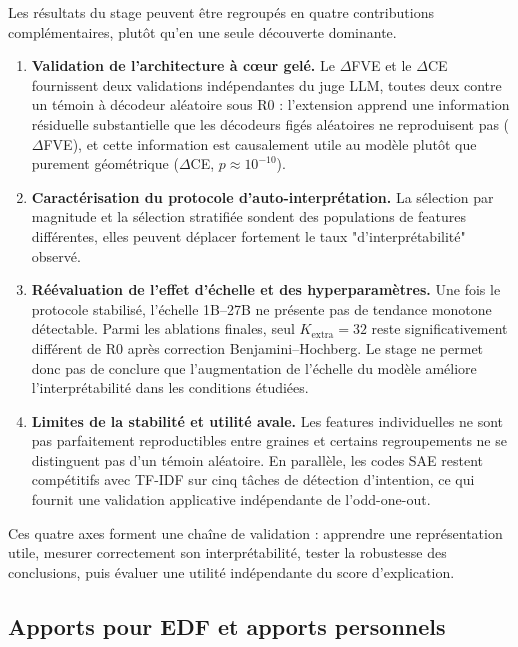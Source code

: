 \documentclass[11pt]{article}
\begin{document}
Les résultats du stage peuvent être regroupés en quatre contributions complémentaires,
plutôt qu'en une seule découverte dominante.

\begin{enumerate}
  \item \textbf{Validation de l'architecture à cœur gelé.} Le $\Delta$FVE et le
  $\Delta$CE fournissent deux validations indépendantes du juge LLM, toutes deux contre
  un témoin à décodeur aléatoire sous R0 : l'extension apprend une information
  résiduelle substantielle que les décodeurs figés aléatoires ne reproduisent pas
  ($\Delta$FVE), et cette information est causalement utile au modèle plutôt que
  purement géométrique ($\Delta$CE, $p\approx10^{-10}$).

  \item \textbf{Caractérisation du protocole d'auto-interprétation.} La sélection par
  magnitude et la sélection stratifiée sondent des populations de features différentes,
  elles peuvent déplacer fortement
  le taux "d'interprétabilité" observé.

  \item \textbf{Réévaluation de l'effet d'échelle et des hyperparamètres.} Une fois le
  protocole stabilisé, l'échelle 1B--27B ne présente pas de tendance monotone détectable.
  Parmi les ablations finales, seul $K_\text{extra}=32$ reste significativement différent
  de R0 après correction Benjamini--Hochberg. Le stage ne permet donc pas de conclure
  que l'augmentation de l'échelle du modèle améliore l'interprétabilité dans les
  conditions étudiées.

  \item \textbf{Limites de la stabilité et utilité avale.} Les features individuelles
  ne sont pas parfaitement reproductibles entre graines et certains regroupements ne
  se distinguent pas d'un témoin aléatoire. En parallèle, les codes SAE restent
  compétitifs avec TF-IDF sur cinq tâches de détection d'intention, ce qui fournit une
  validation applicative indépendante de l'odd-one-out.
\end{enumerate}

Ces quatre axes forment une chaîne de validation : apprendre une représentation utile,
mesurer correctement son interprétabilité, tester la robustesse des conclusions, puis
évaluer une utilité indépendante du score d'explication.

\subsection{Apports pour EDF et apports personnels}
\end{document}
